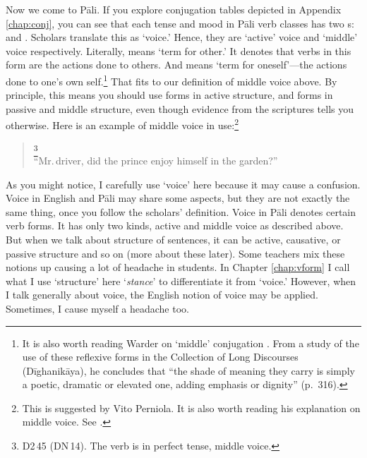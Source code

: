 Now we come to P\=ali. If you explore conjugation tables depicted in Appendix \ref{chap:conj}, you can see that each tense and mood in P\=ali verb classes has two s:  and . Scholars translate this  as `voice.' Hence, they are `active' voice and `middle' voice respectively. Literally,  means `term for other.' It denotes that verbs in this form are the actions done to others. And  means `term for oneself'---the actions done to one's own self.\footnote{It is also worth reading Warder on `middle' conjugation \citep[pp.~314--6]{warder:intro}. From a study of the use of these reflexive forms in the Collection of Long Discourses (D\=ighanik\=aya), he concludes that ``the shade of meaning they carry is simply a poetic, dramatic or elevated one, adding emphasis or dignity'' (p.~316).} That fits to our definition of middle voice above. By principle, this means you should use  forms in active structure, and  forms in passive and middle structure, even though evidence from the scriptures tells you otherwise. Here is an example of middle voice in use:\footnote{This is suggested by Vito Perniola. It is also worth reading his explanation on middle voice. See \citealp[pp.~339--41]{perniola:grammar}.}

\begin{quote}
\footnote{D2\,45 (DN\,14). The verb  is in perfect tense, middle voice.}\\
``Mr.\,driver, did the prince enjoy himself in the garden?''
\end{quote}

As you might notice, I carefully use `voice' here because it may cause a confusion. Voice in English and P\=ali may share some aspects, but they are not exactly the same thing, once you follow the scholars' definition. Voice in P\=ali denotes certain verb forms. It has only two kinds, active and middle voice as described above. But when we talk about structure of sentences, it can be active, causative, or passive structure and so on (more about these later). Some teachers mix these notions up causing a lot of headache in students. In Chapter \ref{chap:vform} I call what I use `structure' here `\emph{stance}' to differentiate it from `voice.' However, when I talk generally about voice, the English notion of voice may be applied. Sometimes, I cause myself a headache too.

